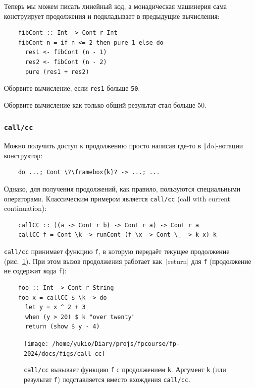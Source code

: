 Теперь мы можем писать линейный код, а монадическая машинерия сама конструирует продолжения и подкладывает в предыдущие вычисления:
\begin{verbatim}
    fibCont :: Int -> Cont r Int
    fibCont n = if n <= 2 then pure 1 else do
      res1 <- fibCont (n - 1)
      res2 <- fibCont (n - 2)
      pure (res1 + res2)
\end{verbatim}

\begin{task}
    Оборвите вычисление, если \texttt{res1} больше \texttt{50}.
\end{task}

\begin{task}
    Оборвите вычисление как только общий результат стал больше 50.
\end{task}

\subsubsection{\texttt{call/cc}}

Можно получить доступ к продолжению просто написав где-то в \texttt|do|-нотации конструктор:
\begin{verbatim}
    do ...; Cont \?\framebox{k}? -> ...; ...
\end{verbatim}
Однако, для получения продолжений, как правило, пользуются специальными операторами.
Классическим примером является \texttt{call/cc} (call with current continuation):
\begin{verbatim}
    callCC :: ((a -> Cont r b) -> Cont r a) -> Cont r a
    callCC f = Cont \k -> runCont (f \x -> Cont \_ -> k x) k
\end{verbatim}

\texttt{call/cc} принимает функцию \texttt{f}, в которую передаёт текущее продолжение (рис.~\ref{fig:call-cc}).
При этом вызов продолжения работает как \texttt|return| для \texttt{f} (продолжение не содержит кода \texttt{f}):
\begin{verbatim}
    foo :: Int -> Cont r String
    foo x = callCC $ \k -> do
      let y = x ^ 2 + 3
      when (y > 20) $ k "over twenty"
      return (show $ y - 4)
\end{verbatim}

\begin{figure}[h]
    \centering
    \texttt{[image: /home/yukio/Diary/projs/fpcourse/fp-2024/docs/figs/call-cc]}
    \caption{\texttt{call/cc} вызывает функцию \texttt{f} с продолжением \texttt{k}.
    Аргумент \texttt{k} (или результат \texttt{f}) подставляется вместо вхождения \texttt{call/cc}.}
    \label{fig:call-cc}
\end{figure}


